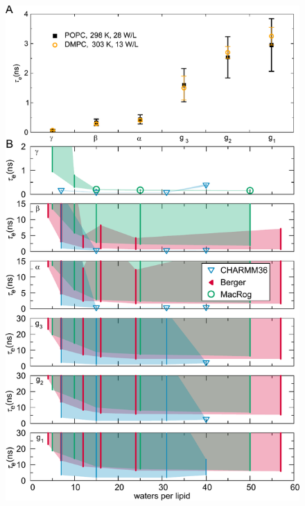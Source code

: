 \documentclass[journal=jcisd8,manuscript=article,layout=twocolumn]{achemso}
\begin{document}
\begin{figure}[ht!]
\centering
\includegraphics[width=\columnwidth]{../Figs/hydration_2020.pdf} 


\end{figure}
\end{document}
